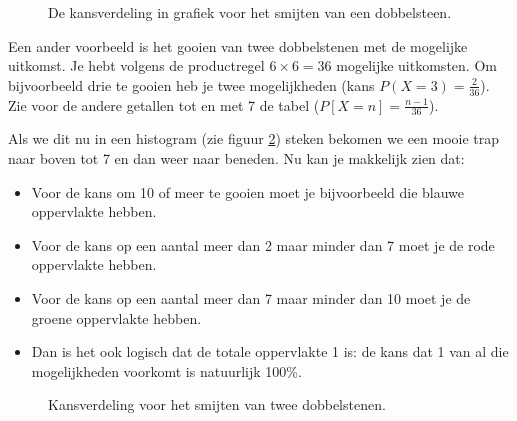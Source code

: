 \begin{figure}
    \begin{center}
	\end{center}
	\label{fig:pbDobbelsteen}
	\caption{De kansverdeling in grafiek voor het smijten van een dobbelsteen.}
\end{figure}

Een ander voorbeeld is het gooien van twee dobbelstenen met de mogelijke uitkomst. Je hebt volgens de productregel $6 \times 6 = 36$ mogelijke uitkomsten. Om bijvoorbeeld drie te gooien heb je twee mogelijkheden (kans $P(X=3) = \frac{2}{36}$). Zie voor de andere getallen tot en met 7 de tabel ($ P[X=n] = \frac{n-1}{36}$).

Als we dit nu in een histogram (zie figuur \ref{fig:pbTweedobbelstenen}) steken bekomen we een mooie trap naar boven tot 7 en dan weer naar beneden. Nu kan je makkelijk zien dat:
\begin{itemize}
  \item Voor de kans om 10 of meer te gooien moet je bijvoorbeeld die blauwe oppervlakte hebben.
  \item Voor de kans op een aantal meer dan 2 maar minder dan 7 moet je de rode oppervlakte hebben.
  \item Voor de kans op een aantal meer dan 7 maar minder dan 10 moet je de groene oppervlakte hebben.
  \item Dan is het ook logisch dat de totale oppervlakte 1 is: de kans dat 1 van al die mogelijkheden voorkomt is natuurlijk 100\%.
\end{itemize}
\begin{figure}
    \begin{center}
\end{center}
	\label{fig:pbTweedobbelstenen}
	\caption{Kansverdeling voor het smijten van twee dobbelstenen.}
\end{figure}

